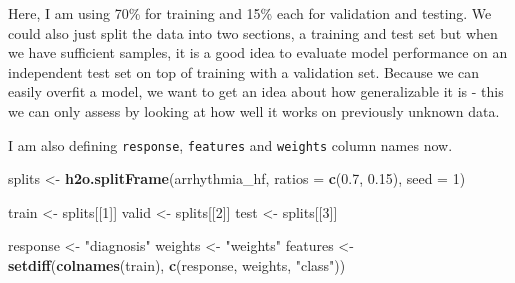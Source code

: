 \documentclass[]{book}
\newenvironment{Shaded}{\begin{snugshade}}{\end{snugshade}}
\newcommand{\CommentTok}[1]{\textcolor[rgb]{0.56,0.35,0.01}{\textit{#1}}}
\newcommand{\DataTypeTok}[1]{\textcolor[rgb]{0.13,0.29,0.53}{#1}}
\newcommand{\DecValTok}[1]{\textcolor[rgb]{0.00,0.00,0.81}{#1}}
\newcommand{\FloatTok}[1]{\textcolor[rgb]{0.00,0.00,0.81}{#1}}
\newcommand{\KeywordTok}[1]{\textcolor[rgb]{0.13,0.29,0.53}{\textbf{#1}}}
\newcommand{\NormalTok}[1]{#1}
\newcommand{\OperatorTok}[1]{\textcolor[rgb]{0.81,0.36,0.00}{\textbf{#1}}}
\newcommand{\OtherTok}[1]{\textcolor[rgb]{0.56,0.35,0.01}{#1}}
\newcommand{\StringTok}[1]{\textcolor[rgb]{0.31,0.60,0.02}{#1}}
\begin{document}
Here, I am using 70\% for training and 15\% each for validation and testing. We could also just split the data into two sections, a training and test set but when we have sufficient samples, it is a good idea to evaluate model performance on an independent test set on top of training with a validation set. Because we can easily overfit a model, we want to get an idea about how generalizable it is - this we can only assess by looking at how well it works on previously unknown data.

I am also defining \texttt{response}, \texttt{features} and \texttt{weights} column names now.

\begin{Shaded}
\begin{Highlighting}[]
\NormalTok{splits <-}\StringTok{ }\KeywordTok{h2o.splitFrame}\NormalTok{(arrhythmia_hf, }
                         \DataTypeTok{ratios =} \KeywordTok{c}\NormalTok{(}\FloatTok{0.7}\NormalTok{, }\FloatTok{0.15}\NormalTok{), }
                         \DataTypeTok{seed =} \DecValTok{1}\NormalTok{)}

\NormalTok{train <-}\StringTok{ }\NormalTok{splits[[}\DecValTok{1}\NormalTok{]]}
\NormalTok{valid <-}\StringTok{ }\NormalTok{splits[[}\DecValTok{2}\NormalTok{]]}
\NormalTok{test <-}\StringTok{ }\NormalTok{splits[[}\DecValTok{3}\NormalTok{]]}

\NormalTok{response <-}\StringTok{ "diagnosis"}
\NormalTok{weights <-}\StringTok{ "weights"}
\NormalTok{features <-}\StringTok{ }\KeywordTok{setdiff}\NormalTok{(}\KeywordTok{colnames}\NormalTok{(train), }\KeywordTok{c}\NormalTok{(response, weights, }\StringTok{"class"}\NormalTok{))}
\end{Highlighting}
\end{Shaded}

\begin{Shaded}
\end{Shaded}

\begin{Shaded}
\end{Shaded}
\end{document}
